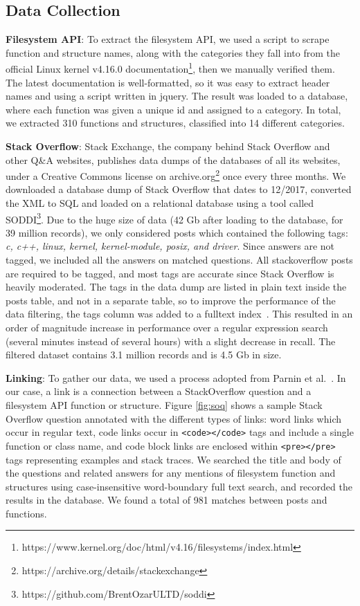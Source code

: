 \subsection{Data Collection}\label{subsec:data}
\textbf{Filesystem API}: To extract the filesystem API, we used a script to scrape function and structure names, along with the categories they fall into from the official Linux kernel v4.16.0 documentation\footnote{https://www.kernel.org/doc/html/v4.16/filesystems/index.html}, then we manually verified them. The latest documentation is well-formatted, so it was easy to extract header names and using a script written in jquery. The result was loaded to a database, where each function was given a unique id and assigned to a category. In total, we extracted 310 functions and structures, classified into 14 different categories.

\textbf{Stack Overflow}: Stack Exchange, the company behind Stack Overflow and other Q\&A websites, publishes data dumps of the databases of all its websites, under a Creative Commons license on archive.org\footnote{https://archive.org/details/stackexchange} once every three months. We downloaded a database dump of Stack Overflow that dates to 12/2017, converted the XML to SQL and loaded on a relational database using a tool called SODDI\footnote{https://github.com/BrentOzarULTD/soddi}. Due to the huge size of data (42 Gb after loading to the database, for 39 million records), we only considered posts which contained the following tags: \textit{c, c++, linux, kernel, kernel-module, posix, and driver}. Since answers are not tagged, we included all the answers on matched questions. All stackoverflow posts are required to be tagged, and most tags are accurate since Stack Overflow is heavily moderated. The tags in the data dump are listed in plain text inside the posts table, and not in a separate table, so to improve the performance of the data filtering, the tags column was added to a fulltext index~\cite{Hamilton2001}. This resulted in an order of magnitude increase in performance over a regular expression search (several minutes instead of several hours) with a slight decrease in recall. The filtered dataset contains 3.1 million records and is 4.5 Gb in size.

\textbf{Linking}: To gather our data, we used a process adopted from Parnin et al.~\cite{Parnin2012CrowdDE}.
In our case, a link is a connection between a StackOverflow question and a filesystem API function or structure. Figure \ref{fig:soq} shows a sample Stack Overflow question annotated with the different types of links: word links which occur in regular text, code links occur in \texttt{<code></code>} tags and include a single function or class name, and code block links are enclosed within \texttt{<pre></pre>} tags representing examples and stack traces. We searched the title and body of the questions and related answers for any mentions of filesystem function and structures using case-insensitive word-boundary full text search, and recorded the results in the database. We found a total of 981 matches between posts and functions.

